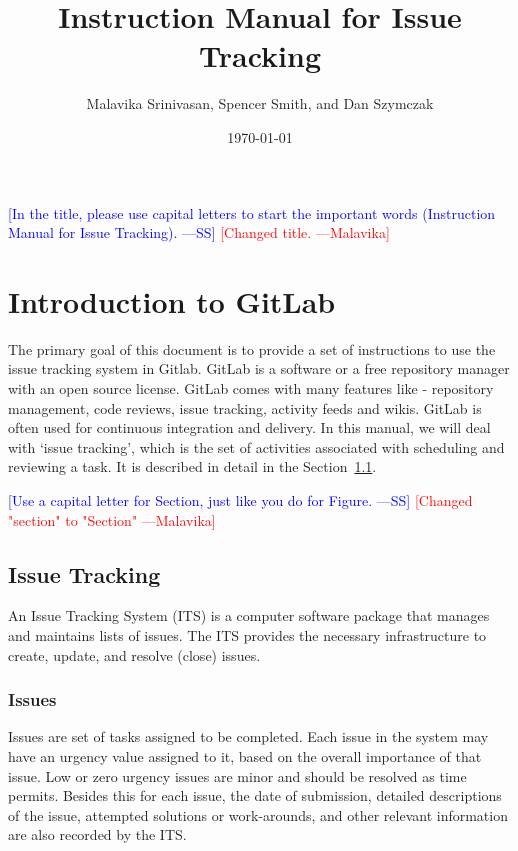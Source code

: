 \documentclass[11pt, oneside]{article}   	%
\newcommand{\authornote}[3]{\textcolor{#1}{[#3 ---#2]}}
\newcommand{\authornote}[3]{}
\newcommand{\wss}[1]{\authornote{blue}{SS}{#1}}
\newcommand{\ms}[1]{\authornote{red}{Malavika}{#1}}
\begin{document}
\title{Instruction Manual for Issue Tracking} 
\author{Malavika Srinivasan, Spencer Smith, and Dan Szymczak}

\date{\today}

\maketitle

\wss{In the title, please use capital letters to start the important words
  (Instruction Manual for Issue Tracking).}
  \ms{Changed title.}

\tableofcontents
\newpage

\section{Introduction to GitLab} \label{Introduction}

The primary goal of this document is to provide a set of instructions to use the
issue tracking system in Gitlab.  GitLab is a software or a free repository
manager with an open source license. GitLab comes with many features like -
repository management, code reviews, issue tracking, activity feeds and
wikis. GitLab is often used for continuous integration and delivery. In this
manual, we will deal with `issue tracking', which is the set of activities
associated with scheduling and reviewing a task. It is described in detail in
the Section~\ref{Issue_Tracking}.

\wss{Use a capital letter for Section, just like you do for Figure.}
\ms{Changed "section" to "Section"}

\subsection{Issue Tracking}\label{Issue_Tracking}

An Issue Tracking System (ITS) is a computer software package that manages and
maintains lists of issues. The ITS provides the necessary infrastructure to
create, update, and resolve (close) issues.

\subsubsection{Issues}

Issues are set of tasks assigned to be completed. Each issue in the system may
have an urgency value assigned to it, based on the overall importance of that
issue. Low or zero urgency issues are minor and should be resolved as time
permits. Besides this for each issue, the date of submission, detailed
descriptions of the issue, attempted solutions or work-arounds, and other
relevant information are also recorded by the ITS.
\end{document}
